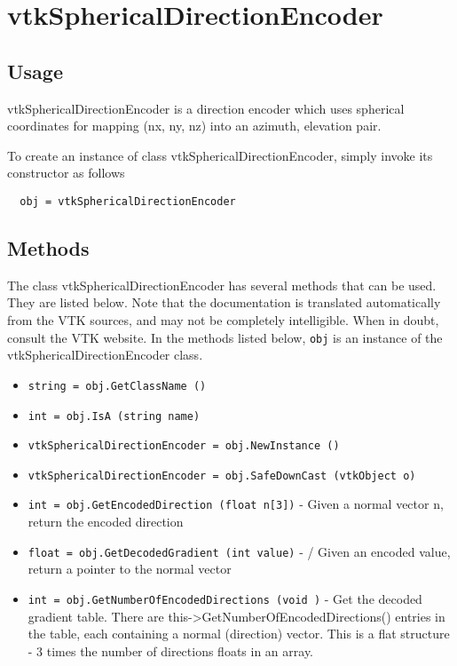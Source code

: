 \section{vtkSphericalDirectionEncoder}

\subsection{Usage}

 vtkSphericalDirectionEncoder is a direction encoder which uses spherical
 coordinates for mapping (nx, ny, nz) into an azimuth, elevation pair.


To create an instance of class vtkSphericalDirectionEncoder, simply
invoke its constructor as follows
\begin{verbatim}
  obj = vtkSphericalDirectionEncoder
\end{verbatim}
\subsection{Methods}

The class vtkSphericalDirectionEncoder has several methods that can be used.
  They are listed below.
Note that the documentation is translated automatically from the VTK sources,
and may not be completely intelligible.  When in doubt, consult the VTK website.
In the methods listed below, \verb|obj| is an instance of the vtkSphericalDirectionEncoder class.
\begin{itemize}
\item  \verb|string = obj.GetClassName ()|

\item  \verb|int = obj.IsA (string name)|

\item  \verb|vtkSphericalDirectionEncoder = obj.NewInstance ()|

\item  \verb|vtkSphericalDirectionEncoder = obj.SafeDownCast (vtkObject o)|

\item  \verb|int = obj.GetEncodedDirection (float n[3])| -  Given a normal vector n, return the encoded direction  

\item  \verb|float = obj.GetDecodedGradient (int value)| - / Given an encoded value, return a pointer to the normal vector

\item  \verb|int = obj.GetNumberOfEncodedDirections (void )| -  Get the decoded gradient table. There are 
 this->GetNumberOfEncodedDirections() entries in the table, each
 containing a normal (direction) vector. This is a flat structure - 
 3 times the number of directions floats in an array.

\end{itemize}
